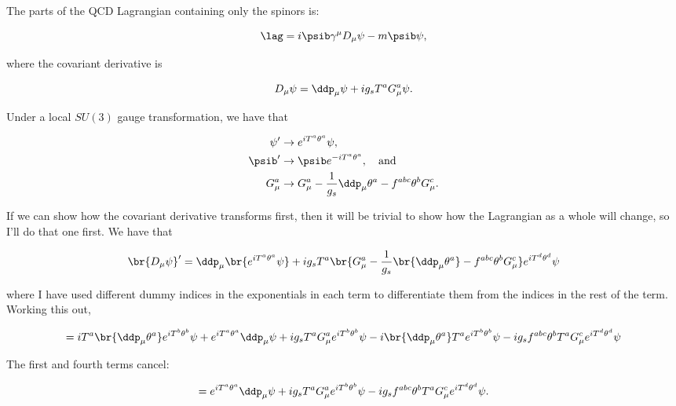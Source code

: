 \section{}

The parts of the QCD Lagrangian containing only the spinors is:

\begin{equation}
  \lag = i\psib \gamma^\mu D_\mu \psi - m\psib\psi,
\end{equation}

where the covariant derivative is

\begin{equation}
  D_\mu\psi = \ddp_\mu\psi + ig_s T^aG^a_\mu \psi.
\end{equation}

Under a local $SU(3)$ gauge transformation, we have that

\begin{align}
  \psi' &\rightarrow e^{iT^a\theta^a}\psi, \\
  \psib' &\rightarrow \psib e^{-iT^a\theta^a}, \quad\text{and} \\
  G^a_\mu &\rightarrow G^a_\mu - \frac{1}{g_s}\ddp_\mu\theta^a - f^{abc}\theta^b G^c_\mu.
\end{align}

If we can show how the covariant derivative transforms first, then it will be trivial to show how the Lagrangian as a whole will change, so I'll do that one first. We have that

\begin{equation}
  \br{D_\mu\psi}' = \ddp_\mu\br{e^{iT^a\theta^a}\psi} + ig_sT^a\br{G^a_\mu - \frac{1}{g_s}\br{\ddp_\mu\theta^a} - f^{abc}\theta^b G^c_\mu}e^{iT^d\theta^d}\psi
\end{equation}

where I have used different dummy indices in the exponentials in each term to differentiate them from the indices in the rest of the term. Working this out,

\begin{gather}
  = iT^a\br{\ddp_\mu\theta^a}e^{iT^b\theta^b}\psi + e^{iT^a\theta^a}\ddp_\mu\psi + ig_sT^aG^a_\mu e^{iT^b\theta^b}\psi - i\br{\ddp_\mu\theta^a}T^a e^{iT^b\theta^b}\psi - ig_s f^{abc}\theta^bT^aG^c_\mu e^{iT^d\theta^d}\psi
\end{gather}

The first and fourth terms cancel:

\begin{equation}
  = e^{iT^a\theta^a}\ddp_\mu\psi + ig_s T^aG^a_\mu e^{iT^b\theta^b}\psi - ig_sf^{abc}\theta^bT^aG^c_\mu e^{iT^d\theta^d}\psi.
\end{equation}

